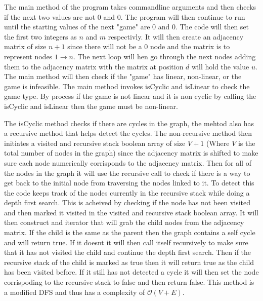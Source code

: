 \documentclass[11pt]{article}
\begin{document}
The main method of the program takes commandline arguments and then checks if the next two values are not $0$ and $0$. The program will then continue to run until the starting values of the next "game" are $0$ and $0$. The code will then set the first two integers as $n$ and $m$ respectivly. It will then create an adjacency matrix of size $n + 1$ since there will not be a $0$ node and the matrix is to represent nodes $ 1\rightarrow  n$. The next loop will hen go through the next nodes adding them to the adjacency matrix with the matrix at position $d$ will hold the value $u$. The main method will then check if the "game" has linear, non-linear, or the game is infeasible. The main method invokes isCyclic and isLinear to check the game type. By process if the game is not linear and it is non cyclic by calling the isCyclic and isLinear then the game must be non-linear.

The isCyclic method checks if there are cycles in the graph, the mehtod also has a recursive method that helps detect the cycles. The non-recursive method then initiates a visited and recursive stack boolean array of size $V + 1$ (Where $V$ is the total number of nodes in the graph) since the adjacency matrix is shifted to make sure each node numerically corrisponds to the adjacency matrix. Then for all of the nodes in the graph it will use the recursive call to check if there is a way to get back to the initial node from traversing the nodes linked to it. To detect this the code keeps track of the nodes currently in the recursive stack while doing a depth first search. This is acheived by checking if the node has not been visited and then marked it visited in the visited and recursive stack boolean array. It will then construct and iterator that will grab the child nodes from the adjacency matrix. If the child is the same as the parent then the graph contains a self cycle and will return true. If it doesnt it will then call itself recursively to make sure that it has not visited the child and continue the depth first search. Then if the recursive stack of the child is marked as true then it will return true as the child has been visited before. If it still has not detected a cycle it will then set the node corrispoding to the recursive stack to false and then return false. This method is a modified DFS and thus has a complexity of $\mathcal{O}(V+E)$.
\end{document}
